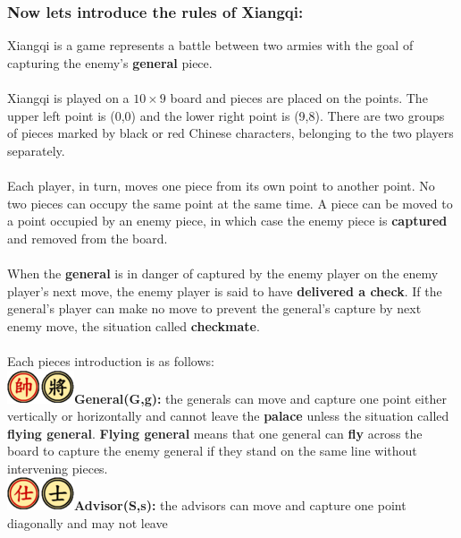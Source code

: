 \documentclass[12pt,a4paper]{article}
\begin{document}
\subsubsection*{Now let\textquotesingle s introduce the rules of Xiangqi:}
Xiangqi is a game represents a battle between two armies with the goal
of capturing the enemy's \textbf{general} piece.
\\\\
\noindent
Xiangqi is played on a $10\times9$ board and pieces are
placed on the points. The upper left point is (0,0) and
the lower right point is (9,8). There are two groups of pieces marked
by black or red Chinese characters, belonging to the two players
separately.
\\\\
\noindent
Each player, in turn, moves one piece from its own point to another point. No two pieces can occupy the
same point at the same time. A piece can be moved to a point occupied
by an enemy piece, in which case the enemy piece is \textbf{captured} and
removed from the board. 
\\\\
\noindent
When the \textbf{general} is in danger of captured
by the enemy player on the enemy player's next move, the enemy player is
said to have \textbf{delivered a check}. If the general's player can make no
move to prevent the general's capture by next enemy move, the situation called \textbf{checkmate}.\\\\
\noindent
Each piece\textquotesingle s introduction is as follows:
\\\noindent
\textbf{\includegraphics{Xiangqi.assets/75px-Xiangqi_General.png}General(G,g):}
the generals can move and capture one point either vertically or
horizontally and cannot leave the \textbf{palace} unless the situation called
\textbf{flying general}. \textbf{Flying general} means that
one general can \textbf{fly} across the board to capture the enemy general if
they stand on the same line without intervening pieces.
\\\noindent
\textbf{\includegraphics{Xiangqi.assets/75px-Xiangqi_Advisor.png}Advisor(S,s):}
the advisors can move and capture one point diagonally and may not leave
\end{document}
